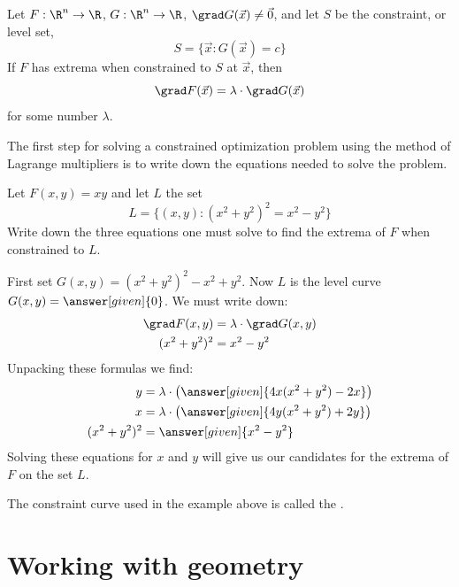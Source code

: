 \documentclass{ximera}
\begin{document}
\begin{theorem}
  Let $F:\R^n\to\R$, $G:\R^n\to\R$, $\grad G(\vec{x}) \ne \vec{0}$,
  and let $S$ be the constraint, or level set,
  \[
  S = \{\vec{x}: G(\vec{x}) = c\}
  \]
  If $F$ has extrema when constrained to $S$ at $\vec{x}$, then
  \[
  \grad F(\vec{x}) = \lambda \cdot \grad G(\vec{x})
  \]
  for some number $\lambda$.
\end{theorem}

The first step for solving a constrained optimization problem using
the method of Lagrange multipliers is to write down the equations
needed to solve the problem.

\begin{example}
  Let $F(x,y) = xy$ and let $L$ the set
  \[
  L = \{(x,y):(x^2+y^2)^2 = x^2-y^2\}
  \]
  Write down the three equations one must solve to find the extrema of
  $F$ when constrained to $L$.
  \begin{explanation}
    First set $G(x,y)= (x^2+y^2)^2 - x^2 +y^2$. Now $L$ is the level
    curve $G(x,y) =\answer[given]{0}$.  We must write down:
    \begin{align*}
      \grad F(x,y) &= \lambda \cdot \grad G(x,y)\\
      (x^2+y^2)^2 &= x^2-y^2
    \end{align*}
    Unpacking these formulas we find:
    \begin{align*}
      y &= \lambda \cdot \left(\answer[given]{4x(x^2+y^2)-2x}\right)\\
      x &= \lambda \cdot \left(\answer[given]{4y(x^2+y^2)+2y}\right)\\
      (x^2+y^2)^2 &= \answer[given]{x^2-y^2}
    \end{align*}
    Solving these equations for $x$ and $y$ will give us our
    candidates for the extrema of $F$ on the set $L$.
  \end{explanation}
\end{example}

\begin{remark}
  The constraint curve used in the example above is called the .
\end{remark}

  


\section{Working with geometry}
\end{document}
